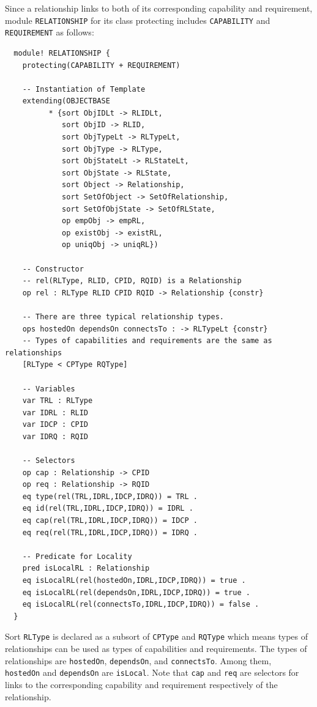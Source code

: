 \documentclass[12pt]{report}
\begin{document}
Since a relationship links to both of its corresponding capability and
requirement, module {\tt RELATIONSHIP} for its class protecting
includes {\tt CAPABILITY} and {\tt REQUIREMENT} as follows:
\small
\begin{verbatim}
  module! RELATIONSHIP {
    protecting(CAPABILITY + REQUIREMENT)
  
    -- Instantiation of Template
    extending(OBJECTBASE
          * {sort ObjIDLt -> RLIDLt,
             sort ObjID -> RLID,
             sort ObjTypeLt -> RLTypeLt,
             sort ObjType -> RLType,
             sort ObjStateLt -> RLStateLt,
             sort ObjState -> RLState,
             sort Object -> Relationship,
             sort SetOfObject -> SetOfRelationship,
             sort SetOfObjState -> SetOfRLState,
             op empObj -> empRL,
             op existObj -> existRL,
             op uniqObj -> uniqRL})
  
    -- Constructor
    -- rel(RLType, RLID, CPID, RQID) is a Relationship
    op rel : RLType RLID CPID RQID -> Relationship {constr}
  
    -- There are three typical relationship types.
    ops hostedOn dependsOn connectsTo : -> RLTypeLt {constr}
    -- Types of capabilities and requirements are the same as relationships
    [RLType < CPType RQType]
  
    -- Variables
    var TRL : RLType
    var IDRL : RLID
    var IDCP : CPID
    var IDRQ : RQID
  
    -- Selectors
    op cap : Relationship -> CPID
    op req : Relationship -> RQID
    eq type(rel(TRL,IDRL,IDCP,IDRQ)) = TRL .
    eq id(rel(TRL,IDRL,IDCP,IDRQ)) = IDRL .
    eq cap(rel(TRL,IDRL,IDCP,IDRQ)) = IDCP .
    eq req(rel(TRL,IDRL,IDCP,IDRQ)) = IDRQ .
  
    -- Predicate for Locality
    pred isLocalRL : Relationship
    eq isLocalRL(rel(hostedOn,IDRL,IDCP,IDRQ)) = true .
    eq isLocalRL(rel(dependsOn,IDRL,IDCP,IDRQ)) = true .
    eq isLocalRL(rel(connectsTo,IDRL,IDCP,IDRQ)) = false .
  }
\end{verbatim}
\normalsize
Sort {\tt RLType} is declared as a subsort of {\tt CPType} and {\tt RQType}
which means types of relationships can be used as types of capabilities
and requirements.
The types of relationships are {\tt hostedOn}, {\tt dependsOn}, and
{\tt connectsTo}.  Among them,\\ {\tt hostedOn} and {\tt dependsOn} are
{\tt isLocal}.  Note that {\tt cap} and {\tt req} are selectors for
links to the corresponding capability and requirement respectively of
the relationship.
\end{document}
